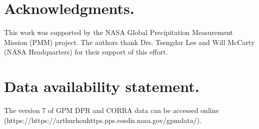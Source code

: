 \documentclass{ametsocV6.1} %
\begin{document}
\section{Acknowledgments.}
This work was supported by the NASA Global Precipitation Measurement Mission (PMM) project. The authors thank Drs. Tsengdar Lee and Will McCarty (NASA Headquarters) for their support of this effort.

\section{Data availability statement.}
The version 7 of GPM DPR and CORRA data can be accessed online  (https://https://arthurhouhttps.pps.eosdis.nasa.gov/gpmdata/). %



%


    
\end{document}
